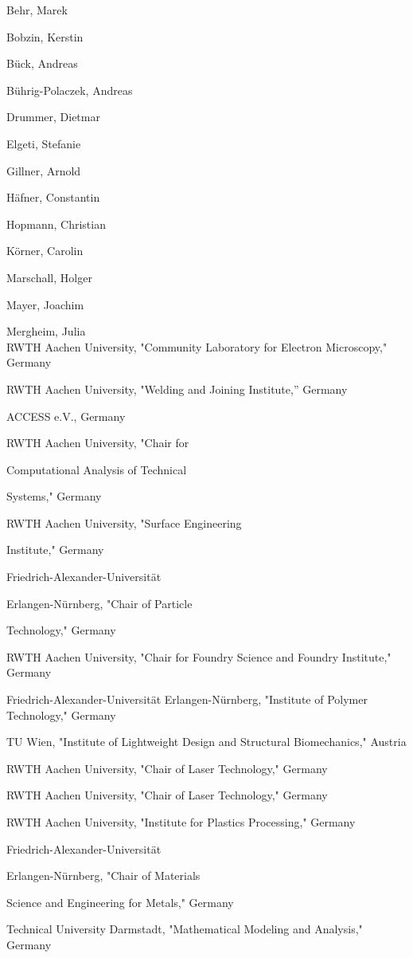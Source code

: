 \documentclass[10pt]{article}
\begin{document}
Behr, Marek

Bobzin, Kerstin

Bück, Andreas

Bührig-Polaczek, Andreas

Drummer, Dietmar

Elgeti, Stefanie

Gillner, Arnold

Häfner, Constantin

Hopmann, Christian

Körner, Carolin

Marschall, Holger

Mayer, Joachim

Mergheim, Julia\\
RWTH Aachen University, "Community Laboratory for Electron Microscopy," Germany

RWTH Aachen University, "Welding and Joining Institute,” Germany

ACCESS e.V., Germany

RWTH Aachen University, "Chair for

Computational Analysis of Technical

Systems," Germany

RWTH Aachen University, "Surface Engineering

Institute," Germany

Friedrich-Alexander-Universität

Erlangen-Nürnberg, "Chair of Particle

Technology," Germany

RWTH Aachen University, "Chair for Foundry Science and Foundry Institute," Germany

Friedrich-Alexander-Universität Erlangen-Nürnberg, "Institute of Polymer Technology," Germany

TU Wien, "Institute of Lightweight Design and Structural Biomechanics," Austria

RWTH Aachen University, "Chair of Laser Technology," Germany

RWTH Aachen University, "Chair of Laser Technology," Germany

RWTH Aachen University, "Institute for Plastics Processing," Germany

Friedrich-Alexander-Universität

Erlangen-Nürnberg, "Chair of Materials

Science and Engineering for Metals," Germany

Technical University Darmstadt, "Mathematical Modeling and Analysis," Germany
\end{document}
